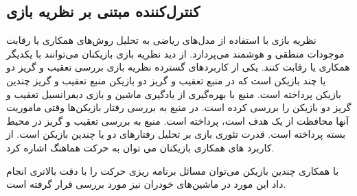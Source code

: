 \documentclass{CCI2020}
\begin{document}
\subsection{کنترل‌کننده مبتنی بر نظریه بازی}\label{gameControl}
نظریه بازی با استفاده از مدل‌های ریاضی به تحلیل روش‌های همکاری یا رقابت موجودات منطقی و هوشمند می‌پردازد.
از دید نظریه بازی بازیکنان می‌توانند با یکدیگر همکاری یا رقابت کنند. 
یکی از کاربردهای گسترده نظریه بازی بررسی تعقیب و گریز دو یا چند بازیکن است که در منبع  \cite{9147205}  تعقیب و گریز دو بازیکن منبع \cite{9091321} تعقیب و گریز چندین بازیکن پرداخته است. منبع \cite{9195328} با بهره‌گیری از یادگیری ماشین و بازی دیفرانسیل تعقیب و گریز دو بازیکن را بررسی کرده است. در منبع \cite{9108001} به بررسی رفتار بازیکن‌ها وقتی ماموریت آنها محافظت از یک هدف است، پرداخته است. منبع \cite{9549330} به بررسی تعقیب و گریز  در محیط بسته پرداخته است.
 قدرت تئوری بازی بر تحلیل رفتارهای دو یا چندین بازیکن است. از کاربرد های همکاری بازیکنان می توان به حرکت هماهنگ اشاره کرد\cite{9659431}. 

 با همکاری چندین بازیکن می‌توان مسائل برنامه ریزی حرکت را با دقت بالاتری انجام داد\cite{9196517} این مورد در ماشین‌های خودران نیز مورد بررسی قرار گرفته است\cite{9304495}. 
\end{document}
